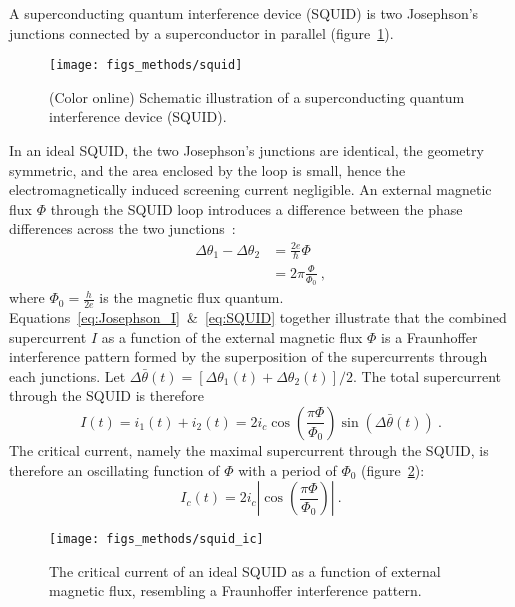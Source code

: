 A superconducting quantum interference device (SQUID) is two Josephson's junctions connected by a superconductor in parallel (figure~\ref{fig:squid}). %
\begin{figure}[ht]%
	\centering%
    \texttt{[image: figs\_methods/squid]}%
    \caption[Superconducting quantum interference device]{\label{fig:squid}(Color online) Schematic illustration of a superconducting quantum interference device (SQUID).}%
\end{figure}%
%
In an ideal SQUID, the two Josephson's junctions are identical, the geometry symmetric, and the area enclosed by the loop is small, hence the electromagnetically induced screening current negligible. An external magnetic flux $\Phi$ through the SQUID loop introduces a difference between the phase differences across the two junctions~\cite{Annett}:%
\begin{align}
    \Delta\theta_1 - \Delta\theta_2 &= \frac{2e}{\hbar}\Phi\nonumber\\
        &= 2\pi\frac{\Phi}{\Phi_0}~,\label{eq:SQUID}
\end{align}%
where $\Phi_0 = \frac{h}{2e}$ is the magnetic flux quantum. Equations~\ref{eq:Josephson_I}~\&~\ref{eq:SQUID} together illustrate that the combined supercurrent $I$ as a function of the external magnetic flux $\Phi$ is a Fraunhoffer interference pattern formed by the superposition of the supercurrents through each junctions. Let $\Delta\bar{\theta}(t) = \left[\Delta\theta_1(t) + \Delta\theta_2(t)\right] / 2$. The total supercurrent through the SQUID is therefore%
\begin{equation}
    I(t) = i_1(t) + i_2(t) = 2i_c\cos\left(\frac{\pi\Phi}{\Phi_0}\right)\sin\left(\Delta\bar{\theta}(t)\right)~.
\end{equation}%
The critical current, namely the maximal supercurrent through the SQUID, is therefore an oscillating function of $\Phi$ with a period of $\Phi_0$ (figure~\ref{fig:squid_ic}):%
\begin{equation}
    I_{c}(t) = 2i_c\left|\cos\left(\frac{\pi\Phi}{\Phi_0}\right)\right|~.
\end{equation}%
\begin{figure}[ht]%
	\centering%
    \texttt{[image: figs\_methods/squid\_ic]}%
    \caption[Oscillations in the critical current of a SQUID]{\label{fig:squid_ic}The critical current of an ideal SQUID as a function of external magnetic flux, resembling a Fraunhoffer interference pattern.}%
\end{figure}%

